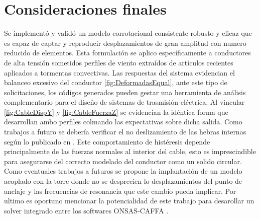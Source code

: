 \chapter{Consideraciones finales}\label{Cap:Conlcusiones}
\linenumbers
Se implementó y validó un modelo corrotacional consistente robusto y eficaz que es capaz de captar y reproducir desplazamientos de gran amplitud con numero reducido de elementos.  Esta formulación se aplico específicamente a conductores de alta tensión sometidos perfiles de viento extraídos de artículos recientes aplicados a tormentas convectivas. Las respuestas del sistema evidencian el balanceo excesivo del conductor \ref{fig:DeformadasEqual}, ante este tipo de solicitaciones, los códigos generados pueden gestar una herramienta de análisis complementario para el diseño de sistemas de trasmisión eléctrica. Al vincular 		\ref{fig:CableDispY} y \ref{fig:CableFuerzaZ} se evidencian la idéntica forma que desarrollan ambo perfiles colmando las expectativas sobre dicha salida. Como trabajos a futuro se debería verificar el no deslizamiento de las hebras internas según lo publicado en \citet{foti2018finite}. Este comportamiento de histéresis depende principalmente de las fuerzas normales al interior del cable, esto es imprescindible para asegurarse del correcto modelado del conductor como un solido circular. Como eventuales trabajos a futuros se propone la implantación de un modelo acoplado con la torre donde no se desprecien lo desplazamientos del punto de anclaje y las frecuencias de resonancia que este cambio pueda implicar. Por ultimo es oportuno mencionar la potencialidad de este trabajo para desarollar un solver integrado entre los softwares ONSAS-CAFFA \cite{usera2008parallel}.


